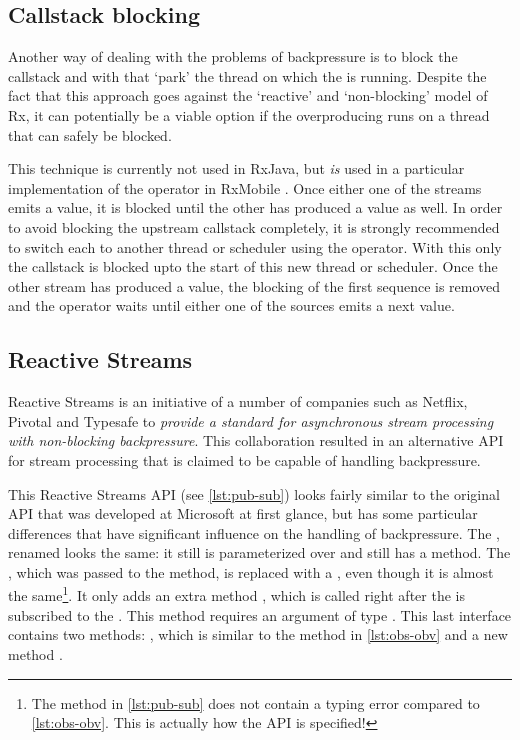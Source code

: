 \subsection{Callstack blocking}
Another way of dealing with the problems of backpressure is to block the callstack and with that `park' the thread on which the \obs is running. Despite the fact that this approach goes against the `reactive' and `non-blocking' model of Rx, it can potentially be a viable option if the overproducing \obs runs on a thread that can safely be blocked.

This technique is currently not used in RxJava, but \emph{is} used in a particular implementation of the  operator in RxMobile . Once either one of the streams emits a value, it is blocked until the other \obs has produced a value as well. In order to avoid blocking the upstream callstack completely, it is strongly recommended to switch each \obs to another thread or scheduler using the  operator. With this only the callstack is blocked upto the start of this new thread or scheduler. Once the other stream has produced a value, the blocking of the first \obs sequence is removed and the  operator waits until either one of the sources emits a next value.

\subsection{Reactive Streams}
Reactive Streams is an initiative  of a number of companies such as Netflix, Pivotal and Typesafe to \textit{provide a standard for asynchronous stream processing with non-blocking backpressure}. This collaboration resulted in an alternative API  for stream processing that is claimed to be capable of handling backpressure.

This Reactive Streams API (see \autoref{lst:pub-sub}) looks fairly similar to the original API that was developed at Microsoft at first glance, but has some particular differences that have significant influence on the handling of backpressure. The \obs, renamed  looks the same: it still is parameterized over  and still has a  method. The \obv, which was passed to the  method, is replaced with a , even though it is almost the same\footnote{The  method in \autoref{lst:pub-sub} does not contain a typing error compared to \autoref{lst:obs-obv}. This is actually how the API is specified!}. It only adds an extra method , which is called right after the  is subscribed to the . This  method requires an argument of type . This last interface contains two methods: , which is similar to the  method in \autoref{lst:obs-obv} and a new method .

